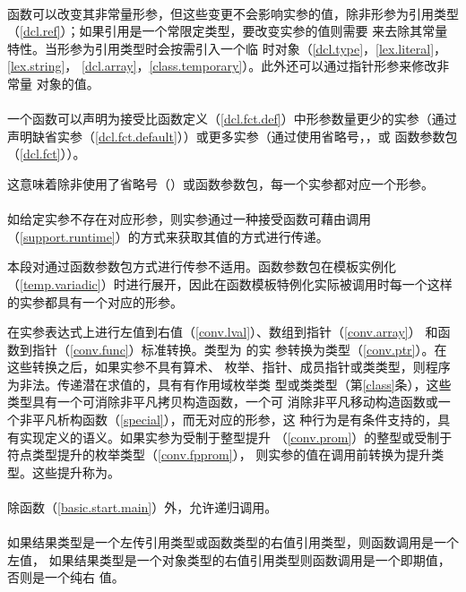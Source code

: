 \paragraph{} %
\begin{note}
  函数可以改变其非常量形参，但这些变更不会影响实参的值，除非形参为引用类型
  （\ref{dcl.ref}）；如果引用是一个常限定类型，要改变实参的值则需要
  来去除其常量特性。当形参为引用类型时会按需引入一个临
  时对象（\ref{dcl.type}，\ref{lex.literal}，\ref{lex.string}，
  \ref{dcl.array}，\ref{class.temporary}）。此外还可以通过指针形参来修改非常量
  对象的值。
\end{note}

\paragraph{} %
一个函数可以声明为接受比函数定义（\ref{dcl.fct.def}）中形参数量更少的实参（通过
声明缺省实参（\ref{dcl.fct.default}））或更多实参（通过使用省略号，，或
函数参数包（\ref{dcl.fct}））。

\begin{note}
  这意味着除非使用了省略号（）或函数参数包，每一个实参都对应一个形参。
\end{note}

\paragraph{} %
如给定实参不存在对应形参，则实参通过一种接受函数可藉由调用
（\ref{support.runtime}）的方式来获取其值的方式进行传递。

\begin{note}
  本段对通过函数参数包方式进行传参不适用。函数参数包在模板实例化
  （\ref{temp.variadic}）时进行展开，因此在函数模板特例化实际被调用时每一个这样
  的实参都具有一个对应的形参。
\end{note}

在实参表达式上进行左值到右值（\ref{conv.lval}）、数组到指针（\ref{conv.array}）
和函数到指针（\ref{conv.func}）标准转换。类型为 的实
参转换为类型（\ref{conv.ptr}）。在这些转换之后，如果实参不具有算术、
枚举、指针、成员指针或类类型，则程序为非法。传递潜在求值的，具有有作用域枚举类
型或类类型（第\ref{class}条），这些类型具有一个可消除非平凡拷贝构造函数，一个可
消除非平凡移动构造函数或一个非平凡析构函数（\ref{special}），而无对应的形参，这
种行为是有条件支持的，具有实现定义的语义。如果实参为受制于整型提升
（\ref{conv.prom}）的整型或受制于符点类型提升的枚举类型（\ref{conv.fpprom}），
则实参的值在调用前转换为提升类型。这些提升称为。

\paragraph{} %
除函数（\ref{basic.start.main}）外，允许递归调用。

\paragraph{} %
如果结果类型是一个左传引用类型或函数类型的右值引用类型，则函数调用是一个左值，
如果结果类型是一个对象类型的右值引用类型则函数调用是一个即期值，否则是一个纯右
值。
